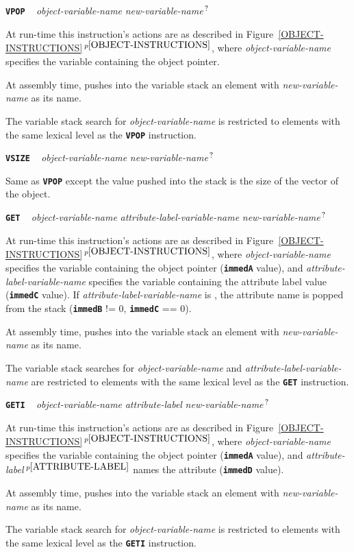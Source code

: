 \documentclass[12pt]{article}
\makeatletter
\newcommand{\TT}[1]{{\tt \bfseries #1}}
\newcommand{\QMARK}{{$^{\,\mbox{\footnotesize ?}}$}}
\newcommand{\ttkey}[1]{\TT{#1}\index{#1@{\tt #1}}}
\newcommand{\itemref}[1]{\ref{#1}$\,^{p\pageref{#1}}$}
\newcommand{\pagnote}[1]{$\,^{p\pageref{#1}}$}
\newcommand{\EOL}{\penalty \exhyphenpenalty}
\newenvironment{indpar}[1][0.3in]%
	{\begin{list}{}%
		     {\setlength{\itemsep}{0in}%
		      \setlength{\topsep}{0in}%
		      \setlength{\parsep}{1ex}%
		      \setlength{\labelwidth}{#1}%
		      \setlength{\leftmargin}{#1}%
		      \addtolength{\leftmargin}{\labelsep}}%
	 \item}%
	{\end{list}}
\makeatother
\begin{document}
\ttkey{VPOP} ~ {\em object-variable-name} {\em new-variable-name}\QMARK{}
\begin{indpar}
At run-time this instruction's actions are as described in
Figure~\itemref{OBJECT-INSTRUCTIONS}, where {\em object-variable-name}
specifies the variable containing the object pointer.

At assembly time, pushes into the variable stack an
element with {\em new-variable-name} as its name.

The variable stack search for {\em object-variable-name} is restricted to
elements with the same lexical level as the \TT{VPOP} instruction.
\end{indpar}

\ttkey{VSIZE} ~ {\em object-variable-name} {\em new-variable-name}\QMARK{}
\begin{indpar}
Same as \TT{VPOP} except the value pushed into the stack is the
size of the vector of the object.
\end{indpar}

\ttkey{GET} ~ {\em object-variable-name} {\em attribute-label-variable-name}
	      {\em new-variable-name}\QMARK{}
\begin{indpar}
At run-time this instruction's actions are as described in
Figure~\itemref{OBJECT-INSTRUCTIONS}, where {\em object-variable-name}
specifies the variable containing the object pointer (\TT{immedA} value), and
{\em attribute-label-variable-name} specifies the variable containing the
attribute label value \EOL (\TT{immedC} value).
If {\em attribute-label-variable-name}
is \TT{*}, the attribute name is popped from the stack
(\TT{immedB} != 0, \TT{immedC} == 0).

At assembly time, pushes into the variable stack an
element with {\em new-variable-name} as its name.

The variable stack searches for {\em object-variable-name} 
and {\em attribute-label-variable-name} are restricted to
elements with the same lexical level as the \TT{GET} instruction.
\end{indpar}

\ttkey{GETI} ~ {\em object-variable-name} {\em attribute-label}
	       {\em new-variable-name}\QMARK{}
\begin{indpar}
At run-time this instruction's actions are as described in
Figure~\itemref{OBJECT-INSTRUCTIONS}, where {\em object-variable-name}
specifies the variable containing the object pointer (\TT{immedA} value), and
{\em attribute-label}\pagnote{ATTRIBUTE-LABEL}
names the attribute (\TT{immedD} value).

At assembly time, pushes into the variable stack an
element with {\em new-variable-name} as its name.

The variable stack search for {\em object-variable-name} 
is restricted to
elements with the same lexical level as the \TT{GETI} instruction.
\end{indpar}
\end{document}
